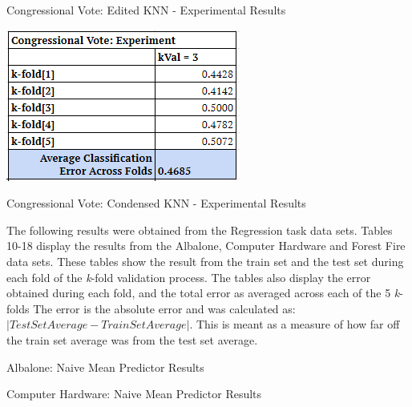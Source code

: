 \documentclass[twoside,11pt]{article}
\begin{document}
\begin{table}[h!]
	\begin{center}
		\caption{Congressional Vote: Edited KNN - Experimental Results}
		\label{tab:table8}
		\includegraphics[scale=.7]{CV_Results_EKNN}\newline
	\end{center}
\end{table}

\begin{table}[h!]
	\begin{center}
		\caption{Congressional Vote: Condensed KNN - Experimental Results}
		\label{tab:table9}
	\end{center}
\end{table}
\newpage

The following results were obtained from the Regression task data sets. Tables 10-18 display the results from the Albalone, Computer Hardware and Forest Fire data sets. These tables show the result from the train set and the test set during each fold of the \textit{k}-fold validation process.  The tables also display the error obtained during each fold, and the total error as averaged across each of the 5 \textit{k}-folds The error is the absolute error and was calculated as: $| Test Set Average - Train Set Average|$. This is meant as a measure of how far off the train set average was from the test set average. 

\begin{table}[h!]
	\begin{center}
		\caption{Albalone: Naive Mean Predictor Results}
		\label{tab:table4}
	\end{center}
\end{table}

\begin{table}[h!]
	\begin{center}
		\caption{Computer Hardware: Naive Mean Predictor Results}
		\label{tab:table5}
	\end{center}
\end{table}
\end{document}
